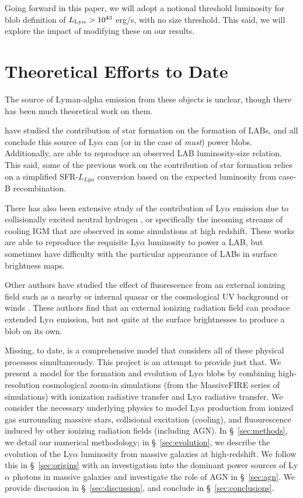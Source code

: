 Going forward in this paper, we will adopt a notional threshold luminosity for blob definition of $L_{\rm Ly\alpha} > 10^{43}$ erg/s, with no size threshold.
This said, we will explore the impact of modifying these on our results.

\section{Theoretical Efforts to Date}

The source of Lyman-alpha emission from these objects is unclear, though there has been much theoretical work on them.

\citet{Furlanetto2005, Laursen2007, Cen2013, Geach2016, Gronke2017} have studied the contribution of star formation on the formation of LABs, and all conclude this source of Ly$\alpha$ can (or in the case of \citet{Cen2013} \emph{must}) power blobs.
Additionally, \citet{Cen2013} are able to reproduce an observed LAB luminosity-size relation.
This said, some of the previous work on the contribution of star formation relies on a simplified SFR-$L_{Ly\alpha}$ conversion based on the expected luminosity from case-B recombination.

There has also been extensive study of the contribution of Ly$\alpha$ emission due to collisionally excited neutral hydrogen \citep{Rosdahl2012, Fardal2001, Goerdt2010, Haiman2000, Faucher-Giguere2010}, or specifically the incoming streams of cooling IGM that are observed in some simulations at high redshift.
These works are able to reproduce the requisite Ly$\alpha$ luminosity to power a LAB, but sometimes have difficulty with the particular appearance of LABs in surface brightness maps.

Other authors have studied the effect of fluorescence from an external ionizing field such as a nearby or internal quasar \citep{Haiman2001} or the cosmological UV background or winds \citep{Furlanetto2005, Mas-Ribas2016}.
These authors find that an external ionizing radiation field can produce extended Ly$\alpha$ emission, but not quite at the surface brightnesses to produce a blob on its own.

Missing, to date, is a comprehensive model that considers all of these physical processes simultaneously.
This project is an attempt to provide just that.
We present a model for the formation and evolution of Ly$\alpha$ blobs by combining high-resolution cosmological zoom-in simulations (from the MassiveFIRE series of simulations) with ionization radiative transfer and Ly$\alpha$ radiative transfer.
We consider the necessary underlying physics to model Ly$\alpha$ production from ionized gas surrounding massive stars, collisional excitation (cooling), and fluourescence induced by other ionizing radiation fields (including AGN).
In \S~\ref{sec:methods}, we detail our numerical methodology; in \S~\ref{sec:evolution}, we describe the evolution of the Ly$\alpha$ luminosity from massive galaxies at high-redshift.
We follow this in \S~\ref{sec:origins} with an investigation into the dominant power sources of Ly$\alpha$ photons in massive galaxies and investigate the role of AGN in \S~\ref{sec:agn}.
We provide discussion in \S~\ref{sec:discussion}, and conclude in \S~\ref{sec:conclusions}.


